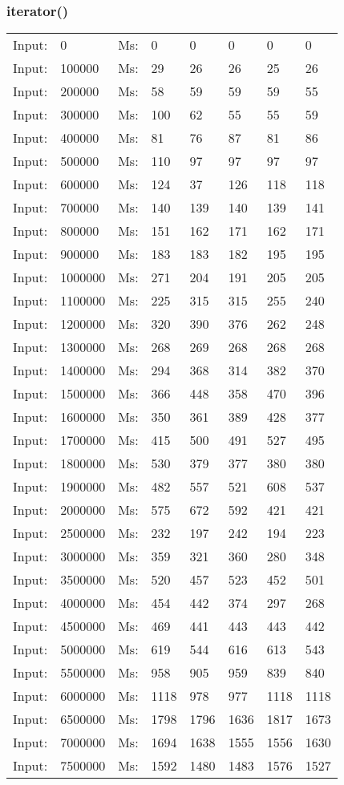 \documentclass[11pt,a4paper]{report}
\begin{document}
\begin{tiny}
\subsubsection{iterator()}
\begin{tabular}{l l ||l  l  l  l  l  l}
Input:&0&Ms:&0&0&0&0&0\\
Input:&100000&Ms:&29&26&26&25&26\\
Input:&200000&Ms:&58&59&59&59&55\\
Input:&300000&Ms:&100&62&55&55&59\\
Input:&400000&Ms:&81&76&87&81&86\\
Input:&500000&Ms:&110&97&97&97&97\\
Input:&600000&Ms:&124&37&126&118&118\\
Input:&700000&Ms:&140&139&140&139&141\\
Input:&800000&Ms:&151&162&171&162&171\\
Input:&900000&Ms:&183&183&182&195&195\\
Input:&1000000&Ms:&271&204&191&205&205\\
Input:&1100000&Ms:&225&315&315&255&240\\
Input:&1200000&Ms:&320&390&376&262&248\\
Input:&1300000&Ms:&268&269&268&268&268\\
Input:&1400000&Ms:&294&368&314&382&370\\
Input:&1500000&Ms:&366&448&358&470&396\\
Input:&1600000&Ms:&350&361&389&428&377\\
Input:&1700000&Ms:&415&500&491&527&495\\
Input:&1800000&Ms:&530&379&377&380&380\\
Input:&1900000&Ms:&482&557&521&608&537\\
Input:&2000000&Ms:&575&672&592&421&421\\
Input:&2500000&Ms:&232&197&242&194&223\\
Input:&3000000&Ms:&359&321&360&280&348\\
Input:&3500000&Ms:&520&457&523&452&501\\
Input:&4000000&Ms:&454&442&374&297&268\\
Input:&4500000&Ms:&469&441&443&443&442\\
Input:&5000000&Ms:&619&544&616&613&543\\
Input:&5500000&Ms:&958&905&959&839&840\\
Input:&6000000&Ms:&1118&978&977&1118&1118\\
Input:&6500000&Ms:&1798&1796&1636&1817&1673\\
Input:&7000000&Ms:&1694&1638&1555&1556&1630\\
Input:&7500000&Ms:&1592&1480&1483&1576&1527\\
\end{tabular}


\end{tiny}
\end{document}
